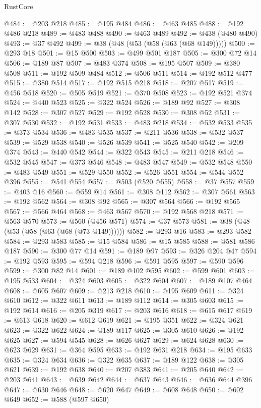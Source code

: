 \begin{lexlean}{RustCore}
\begin{coremodule}
@484 := @203 @218
@485 := @195 @484
@486 := @463 @485
@488 := @192 @486 @218
@489 := @483 @488
@490 := @463 @489
@492 := @438 (@480 @490)
@493 := @37 @492
@499 := @38 (@48 (@53 (@58 (@63 (@68 @149)))))
@500 := @293 @18
@501 := @15 @500
@503 := @499 @501 @187
@505 := @300 @72 @14
@506 := @189 @87
@507 := @483 @374
@508 := @195 @507
@509 := @380 @508
@511 := @192 @509 @484
@512 := @506 @511
@514 := @192 @512 @477
@515 := @380 @514
@517 := @192 @515 @218
@518 := @207 @517
@519 := @456 @518
@520 := @505 @519
@521 := @370 @508
@523 := @192 @521 @374
@524 := @440 @523
@525 := @322 @524
@526 := @189 @92
@527 := @308 @142
@528 := @307 @527
@529 := @192 @528
@530 := @308 @52
@531 := @307 @530
@532 := @192 @531
@533 := @483 @218
@534 := @532 @533
@535 := @373 @534
@536 := @483 @535
@537 := @211 @536
@538 := @532 @537
@539 := @529 @538
@540 := @526 @539
@541 := @525 @540
@542 := @209 @374
@543 := @440 @542
@544 := @322 @543
@545 := @211 @218
@546 := @532 @545
@547 := @373 @546
@548 := @483 @547
@549 := @532 @548
@550 := @483 @549
@551 := @529 @550
@552 := @526 @551
@554 := @544 @552 @396
@555 := @541 @554
@557 := @503 (@520 @555)
@558 := @37 @557
@559 := @403 @16
@560 := @559 @14
@561 := @308 @112
@562 := @307 @561
@563 := @192 @562
@564 := @308 @92
@565 := @307 @564
@566 := @192 @565
@567 := @566 @464
@568 := @463 @567
@570 := @192 @568 @218
@571 := @563 @570
@573 := @560 (@456 @571)
@574 := @37 @573
@581 := @38 (@48 (@53 (@58 (@63 (@68 (@73 @149))))))
@582 := @293 @16
@583 := @293 @582
@584 := @293 @583
@585 := @15 @584
@586 := @15 @585
@588 := @581 @586 @187
@590 := @300 @77 @14
@591 := @189 @97
@593 := @326 @204 @47
@594 := @192 @593
@595 := @594 @218
@596 := @591 @595
@597 := @590 @596
@599 := @300 @82 @14
@601 := @189 @102 @595
@602 := @599 @601
@603 := @195 @533
@604 := @324 @603
@605 := @322 @604
@607 := @189 @107 @464
@608 := @605 @607
@609 := @213 @218
@610 := @195 @609
@611 := @324 @610
@612 := @322 @611
@613 := @189 @112
@614 := @305 @603
@615 := @192 @614
@616 := @205 @319
@617 := @203 @616
@618 := @615 @617
@619 := @613 @618
@620 := @612 @619
@621 := @195 @351
@622 := @324 @621
@623 := @322 @622
@624 := @189 @117
@625 := @305 @610
@626 := @192 @625
@627 := @594 @545
@628 := @626 @627
@629 := @624 @628
@630 := @623 @629
@631 := @364 @595
@633 := @192 @631 @218
@634 := @195 @633
@635 := @324 @634
@636 := @322 @635
@637 := @189 @122
@638 := @305 @621
@639 := @192 @638
@640 := @207 @383
@641 := @205 @640
@642 := @203 @641
@643 := @639 @642
@644 := @637 @643
@646 := @636 @644 @396
@647 := @630 @646
@648 := @620 @647
@649 := @608 @648
@650 := @602 @649
@652 := @588 (@597 @650)

\end{coremodule}
\end{lexlean}
